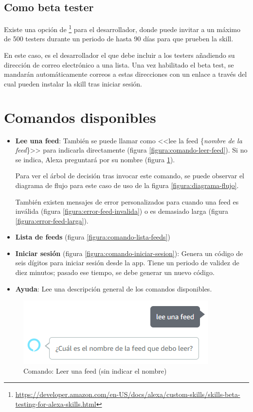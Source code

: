 \documentclass[11pt,spanish,listoffigures,listoftables,table,hyphens,dvipsnames]{tfgetsinf}
\newcommand{\fe}[1]{\foreign{english}{#1}}
\begin{document}
\subsection{Como beta tester}

Existe una opción de \fe{beta testing}\footnote{\url{https://developer.amazon.com/en-US/docs/alexa/custom-skills/skills-beta-testing-for-alexa-skills.html}} para el desarrollador, donde puede invitar a un máximo de 500 testers durante un periodo de hasta 90 días para que prueben la skill.

En este caso, es el desarrollador el que debe incluir a los testers añadiendo su dirección de correo electrónico a una lista. Una vez habilitado el beta test, se mandarán automáticamente correos a estas direcciones con un enlace a través del cual pueden instalar la skill tras iniciar sesión.

\section{Comandos disponibles}

\begin{itemize}
   \item \textbf{Lee una feed}: También se puede llamar como <<lee la feed \{\emph{nombre de la feed}\}>> para indicarla directamente (figura \ref{figura:comando-leer-feed}). Si no se indica, Alexa preguntará por su nombre (figura \ref{figura:comando-leer-feed-sin-nombre}).
   
   Para ver el árbol de decisión tras invocar este comando, se puede observar el diagrama de flujo para este caso de uso de la figura \ref{figura:diagrama-flujo}.

   También existen mensajes de error personalizados para cuando una feed es inválida (figura \ref{figura:error-feed-invalida}) o es demasiado larga (figura \ref{figura:error-feed-larga}).
   \item \textbf{Lista de feeds} (figura \ref{figura:comando-lista-feeds})
   \item \textbf{Iniciar sesión} (figura \ref{figura:comando-iniciar-sesion}): Genera un código de seis dígitos para iniciar sesión desde la app. Tiene un periodo de validez de diez minutos; pasado ese tiempo, se debe generar un nuevo código.
   \item \textbf{Ayuda}: Lee una descripción general de los comandos disponibles.
\end{itemize}

\begin{figure}[ht]
   \centering
   \includegraphics[width=.9\textwidth]{leer-feed-sin-nombre.png}
   \caption{Comando: Leer una feed (sin indicar el nombre)}
   \label{figura:comando-leer-feed-sin-nombre}
\end{figure}
\end{document}
